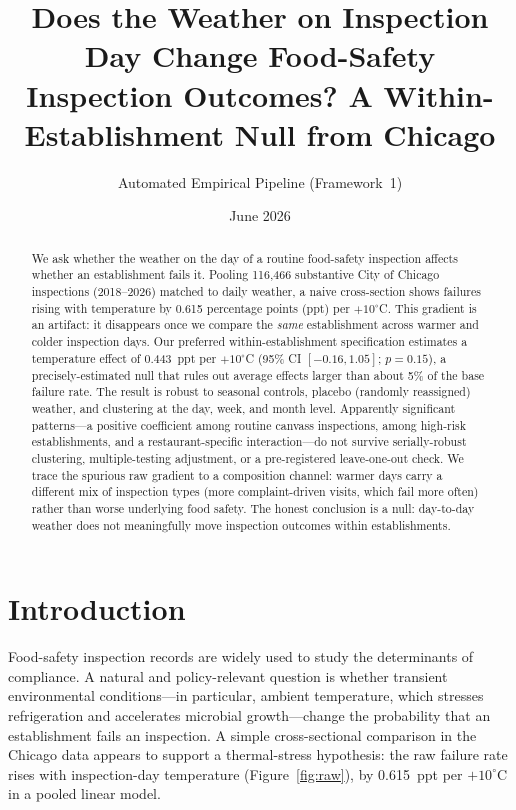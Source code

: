 \documentclass[11pt]{article}
\title{\textbf{Does the Weather on Inspection Day Change Food-Safety Inspection
Outcomes? A Within-Establishment Null from Chicago}}
\author{Automated Empirical Pipeline (Framework~1)}
\date{June 2026}
\begin{document}
\maketitle

\begin{abstract}
\noindent We ask whether the weather on the day of a routine food-safety inspection
affects whether an establishment fails it. Pooling 116{,}466 substantive City of Chicago
inspections (2018--2026) matched to daily weather, a naive cross-section shows failures
rising with temperature by 0.615 percentage points (ppt) per $+10^\circ$C. This gradient
is an artifact: it disappears once we compare the \emph{same} establishment across warmer
and colder inspection days. Our preferred within-establishment specification estimates a
temperature effect of 0.443~ppt per $+10^\circ$C (95\% CI $[-0.16, 1.05]$; $p=0.15$), a
precisely-estimated null that rules out average effects larger than about 5\% of the base
failure rate. The result is robust to seasonal controls, placebo (randomly reassigned)
weather, and clustering at the day, week, and month level. Apparently significant
patterns---a positive coefficient among routine canvass inspections, among high-risk
establishments, and a restaurant-specific interaction---do not survive serially-robust
clustering, multiple-testing adjustment, or a pre-registered leave-one-out check. We trace
the spurious raw gradient to a composition channel: warmer days carry a different mix of
inspection types (more complaint-driven visits, which fail more often) rather than worse
underlying food safety. The honest conclusion is a null: day-to-day weather does not
meaningfully move inspection outcomes within establishments.
\end{abstract}

\section{Introduction}
Food-safety inspection records are widely used to study the determinants of compliance.
A natural and policy-relevant question is whether transient environmental
conditions---in particular, ambient temperature, which stresses refrigeration and
accelerates microbial growth---change the probability that an establishment fails an
inspection. A simple cross-sectional comparison in the Chicago data appears to support a
thermal-stress hypothesis: the raw failure rate rises with inspection-day temperature
(Figure~\ref{fig:raw}), by 0.615~ppt per $+10^\circ$C in a pooled linear model.
\end{document}
